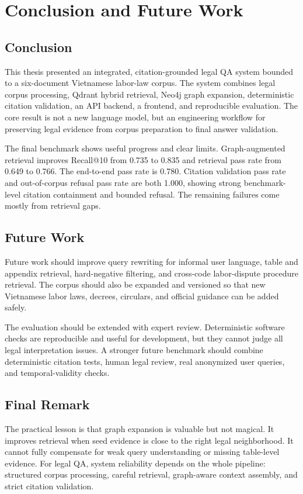 \section{Conclusion and Future Work}

\subsection{Conclusion}
This thesis presented an integrated, citation-grounded legal QA system bounded to a six-document Vietnamese labor-law corpus. The system combines legal corpus processing, Qdrant hybrid retrieval, Neo4j graph expansion, deterministic citation validation, an API backend, a frontend, and reproducible evaluation. The core result is not a new language model, but an engineering workflow for preserving legal evidence from corpus preparation to final answer validation.

The final benchmark shows useful progress and clear limits. Graph-augmented retrieval improves Recall@10 from 0.735 to 0.835 and retrieval pass rate from 0.649 to 0.766. The end-to-end pass rate is 0.780. Citation validation pass rate and out-of-corpus refusal pass rate are both 1.000, showing strong benchmark-level citation containment and bounded refusal. The remaining failures come mostly from retrieval gaps.

\subsection{Future Work}
Future work should improve query rewriting for informal user language, table and appendix retrieval, hard-negative filtering, and cross-code labor-dispute procedure retrieval. The corpus should also be expanded and versioned so that new Vietnamese labor laws, decrees, circulars, and official guidance can be added safely.

The evaluation should be extended with expert review. Deterministic software checks are reproducible and useful for development, but they cannot judge all legal interpretation issues. A stronger future benchmark should combine deterministic citation tests, human legal review, real anonymized user queries, and temporal-validity checks.

\subsection{Final Remark}
The practical lesson is that graph expansion is valuable but not magical. It improves retrieval when seed evidence is close to the right legal neighborhood. It cannot fully compensate for weak query understanding or missing table-level evidence. For legal QA, system reliability depends on the whole pipeline: structured corpus processing, careful retrieval, graph-aware context assembly, and strict citation validation.
